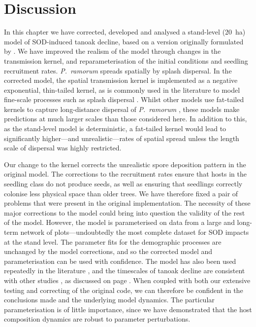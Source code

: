 \section{Discussion\label{sec:ch5:discussion}}

In this chapter we have corrected, developed and analysed a stand-level (\SI{20}{\hectare}) model of SOD-induced tanoak decline, based on a version originally formulated by \citet{cobb_ecosystem_2012}. We have improved the realism of the model through changes in the transmission kernel, and reparameterisation of the initial conditions and seedling recruitment rates. \emph{P.~ramorum} spreads spatially by splash dispersal. In the corrected model, the spatial transmission kernel is implemented as a negative exponential, thin-tailed kernel, as is commonly used in the literature to model fine-scale processes such as splash dispersal \citep{skelsey_pest_2013}. Whilst other models use fat-tailed kernels to capture long-distance dispersal of \emph{P.~ramorum} \citep[e.g.][]{meentemeyer_epidemiological_2011,harwood_epidemiological_2009}, these models make predictions at much larger scales than those considered here. In addition to this, as the stand-level model is deterministic, a fat-tailed kernel would lead to significantly higher---and unrealistic---rates of spatial spread unless the length scale of dispersal was highly restricted.

Our change to the kernel corrects the unrealistic spore deposition pattern in the original model. The corrections to the recruitment rates ensure that hosts in the seedling class do not produce seeds, as well as ensuring that seedlings correctly colonise less physical space than older trees. We have therefore fixed a pair of problems that were present in the original implementation. The necessity of these major corrections to the model could bring into question the validity of the rest of the model. However, the model is parameterised on data from a large and long-term network of plots---undoubtedly the most complete dataset for SOD impacts at the stand level. The parameter fits for the demographic processes are unchanged by the model corrections, and so the corrected model and parameterisation can be used with confidence. The model has also been used repeatedly in the literature \citep[e.g.][]{cobb_resiliency_2017, valachovic_forest_2017, cobb_promise_2019}, and the timescales of tanoak decline are consistent with other studies \citep{mcpherson_responses_2010, davidson_transmission_2005}, as discussed on page \pageref{sec:ch5:reparameterisation}. When coupled with both our extensive testing and correcting of the original code, we can therefore be confident in the conclusions made and the underlying model dynamics. The particular parameterisation is of little importance, since we have demonstrated that the host composition dynamics are robust to parameter perturbations.

